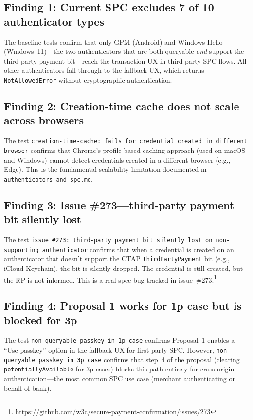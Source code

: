 \documentclass[12pt,a4paper]{article}
\begin{document}
\subsection{Finding 1: Current SPC excludes 7 of 10 authenticator types}

The baseline tests confirm that only GPM (Android) and Windows Hello (Windows~11)---the two authenticators that are both queryable \emph{and} support the third-party payment bit---reach the transaction UX in third-party SPC flows. All other authenticators fall through to the fallback UX, which returns \texttt{NotAllowedError} without cryptographic authentication.

\subsection{Finding 2: Creation-time cache does not scale across browsers}

The test \texttt{creation-time-cache: fails for credential created in different browser} confirms that Chrome's profile-based caching approach (used on macOS and Windows) cannot detect credentials created in a different browser (e.g., Edge). This is the fundamental scalability limitation documented in \texttt{authenticators-and-spc.md}.

\subsection{Finding 3: Issue \#273---third-party payment bit silently lost}

The test \texttt{issue \#273: third-party payment bit silently lost on non-supporting authenticator} confirms that when a credential is created on an authenticator that doesn't support the CTAP \texttt{thirdPartyPayment} bit (e.g., iCloud Keychain), the bit is silently dropped. The credential is still created, but the RP is not informed. This is a real spec bug tracked in issue~\#273.\footnote{\url{https://github.com/w3c/secure-payment-confirmation/issues/273}}

\subsection{Finding 4: Proposal 1 works for 1p case but is blocked for 3p}

The test \texttt{non-queryable passkey in 1p case} confirms Proposal~1 enables a ``Use passkey'' option in the fallback UX for first-party SPC. However, \texttt{non-queryable passkey in 3p case} confirms that step~4 of the proposal (clearing \texttt{potentiallyAvailable} for 3p cases) blocks this path entirely for cross-origin authentication---the most common SPC use case (merchant authenticating on behalf of bank).
\end{document}
